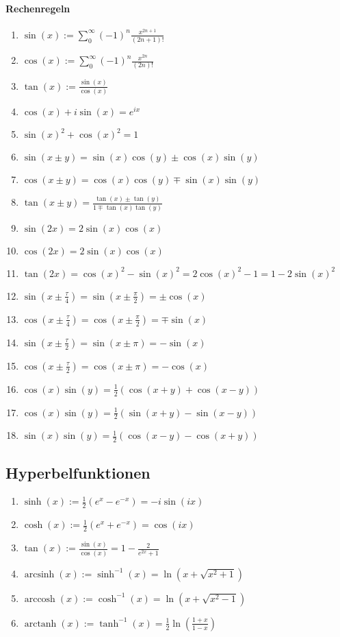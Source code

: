 \documentclass[a4paper, 9pt, DIV=24]{scrartcl}
\DeclareMathOperator{\arcsinh}{arcsinh}
\DeclareMathOperator{\arccosh}{arccosh}
\DeclareMathOperator{\arctanh}{arctanh}
\begin{document}
\paragraph{Rechenregeln}
\begin{enumerate}[label={(}\arabic*{)}]
 \item $\sin(x) := \sum_0^\infty (-1)^n\frac{x^{2n+1}}{(2n+1)!}$
 \item $\cos(x) := \sum_0^\infty (-1)^n\frac{x^{2n}}{(2n)!}$
 \item $\tan(x) := \frac{\sin(x)}{\cos(x)}$
 \item $\cos(x) + i\sin(x) = e^{ix}$
 \item $\sin(x)^2 + \cos(x)^2 = 1$
 \item $\sin(x \pm y) = \sin(x)\cos(y) \pm \cos(x)\sin(y)$
 \item $\cos(x \pm y) = \cos(x)\cos(y) \mp \sin(x)\sin(y)$
 \item $\tan(x \pm y) = \frac{\tan(x)\pm\tan(y)}{1\mp\tan(x)\tan(y)}$
 \item $\sin(2x) = 2\sin(x)\cos(x)$
 \item $\cos(2x) = 2\sin(x)\cos(x)$
 \item $\tan(2x) = \cos(x)^2 - \sin(x)^2 = 2\cos(x)^2 - 1 = 1 - 2\sin(x)^2$
 \item $\sin(x \pm \frac{\tau}{4}) = \sin(x\pm\frac{\pi}{2}) = \pm\cos(x)$
 \item $\cos(x \pm \frac{\tau}{4}) = \cos(x\pm\frac{\pi}{2}) = \mp\sin(x)$
 \item $\sin(x \pm \frac{\tau}{2}) = \sin(x\pm\pi) = -\sin(x)$
 \item $\cos(x \pm \frac{\tau}{2}) = \cos(x\pm\pi) = -\cos(x)$
 \item $\cos(x)\sin(y)=\frac{1}{2} (\cos(x+y)+\cos(x-y))$
 \item $\cos(x)\sin(y)=\frac{1}{2} (\sin(x+y)-\sin(x-y))$
 \item $\sin(x)\sin(y)=\frac{1}{2} (\cos(x-y)-\cos(x+y))$
\end{enumerate}

\subsection{Hyperbelfunktionen}
\begin{enumerate}[label={(}\arabic*{)}]
 \item $\sinh(x) := \frac{1}{2}(e^x-e^{-x}) = -i\sin(ix)$
 \item $\cosh(x) := \frac{1}{2}(e^x+e^{-x}) = \cos(ix)$
 \item $\tan(x) := \frac{\sin(x)}{\cos(x)} = 1 - \frac{2}{e^{2x}+1}$
 \item $\arcsinh(x) := \sinh^{-1}(x) = \ln(x + \sqrt{x^2+1})$
 \item $\arccosh(x) := \cosh^{-1}(x) = \ln(x + \sqrt{x^2-1})$
 \item $\arctanh(x) := \tanh^{-1}(x) = \frac{1}{2}\ln(\frac{1+x}{1-x})$
\end{enumerate}
\end{document}
